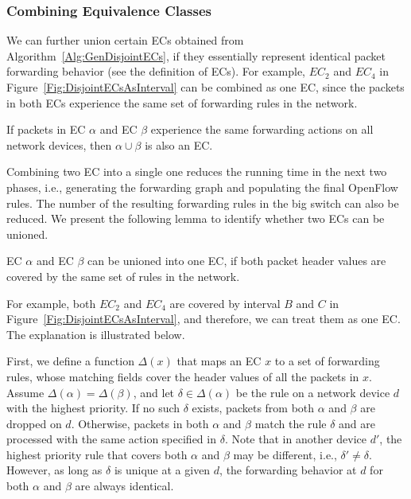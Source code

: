 \subsubsection{Combining Equivalence Classes}
We can further union certain ECs obtained from Algorithm~\ref{Alg:GenDisjointECs}, if they essentially represent identical packet forwarding behavior (see the definition of ECs). For example, $EC_2$ and $EC_4$ in Figure~\ref{Fig:DisjointECsAsInterval} can be combined as one EC, since the packets in both ECs experience the same set of forwarding rules in the network. %

\begin{lemma}
If packets in EC $\alpha$ and EC $\beta$ experience the same forwarding actions on all network devices, then $\alpha \cup \beta$ is also an EC.
\label{Lemma:MergeFG}
\end{lemma}
Combining two EC into a single one reduces the running time in the next two phases, i.e., generating the forwarding graph and populating the final OpenFlow rules. The number of the resulting forwarding rules in the big switch can also be reduced. We present the following lemma to identify whether two ECs can be unioned.

\begin{lemma}
EC $\alpha$ and EC $\beta$ can be unioned into one EC, if both packet header values are covered by the same set of rules in the network.
\label{Lemma:MergeEC}
\end{lemma}
For example, both $EC_2$ and $EC_4$ are covered by interval $B$ and $C$ in Figure~\ref{Fig:DisjointECsAsInterval}, and therefore, we can treat them as one EC. The explanation is illustrated below.

First, we define a function $\Delta(x)$ that maps an EC $x$ to a set of forwarding rules, whose matching fields cover the header values of all the packets in $x$. Assume $\Delta(\alpha) = \Delta(\beta)$, and let $\delta \in \Delta(\alpha)$ be the rule on a network device $d$ with the highest priority.
If no such $\delta$ exists, packets from both $\alpha$ and $\beta$ are dropped on $d$.
Otherwise, packets in both $\alpha$ and $\beta$ match the rule $\delta$ and are processed with the same action specified in $\delta$.
Note that in another device $d'$, the highest priority rule that covers both $\alpha$
and $\beta$ may be different, i.e., $\delta' \neq \delta$.
However, as long as $\delta$ is unique at a given $d$, the forwarding behavior at $d$ for both $\alpha$ and $\beta$ are always identical.

